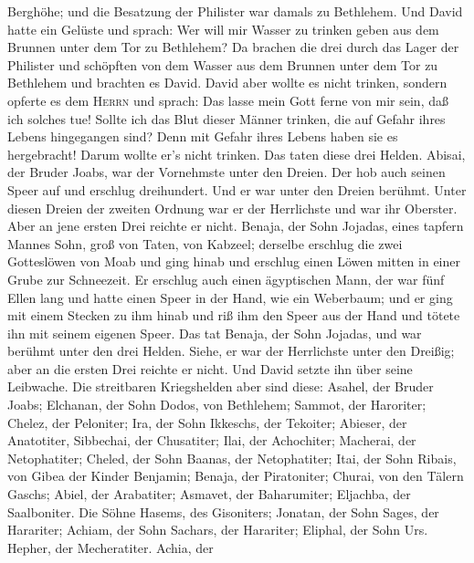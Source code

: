 Berghöhe; und die Besatzung der Philister war damals zu Bethlehem.
 Und David hatte ein Gelüste und sprach: Wer will mir
Wasser zu trinken geben aus dem Brunnen unter dem Tor zu Bethlehem?
 Da brachen die drei durch das Lager der Philister und
schöpften von dem Wasser aus dem Brunnen unter dem Tor zu Bethlehem und
brachten es David. David aber wollte es nicht trinken, sondern opferte
es dem \textsc{Herrn} und sprach:  Das lasse mein Gott
ferne von mir sein, daß ich solches tue! Sollte ich das Blut dieser
Männer trinken, die auf Gefahr ihres Lebens hingegangen sind? Denn mit
Gefahr ihres Lebens haben sie es hergebracht! Darum wollte er's nicht
trinken. Das taten diese drei Helden.  Abisai, der Bruder
Joabs, war der Vornehmste unter den Dreien. Der hob auch seinen Speer
auf und erschlug dreihundert. Und er war unter den Dreien berühmt.
 Unter diesen Dreien der zweiten Ordnung war er der
Herrlichste und war ihr Oberster. Aber an jene ersten Drei reichte er
nicht.  Benaja, der Sohn Jojadas, eines tapfern Mannes
Sohn, groß von Taten, von Kabzeel; derselbe erschlug die zwei
Gotteslöwen von Moab und ging hinab und erschlug einen Löwen mitten in
einer Grube zur Schneezeit.  Er erschlug auch einen
ägyptischen Mann, der war fünf Ellen lang und hatte einen Speer in der
Hand, wie ein Weberbaum; und er ging mit einem Stecken zu ihm hinab und
riß ihm den Speer aus der Hand und tötete ihn mit seinem eigenen Speer.
 Das tat Benaja, der Sohn Jojadas, und war berühmt unter
den drei Helden.  Siehe, er war der Herrlichste unter den
Dreißig; aber an die ersten Drei reichte er nicht. Und David setzte ihn
über seine Leibwache.  Die streitbaren Kriegshelden aber
sind diese: Asahel, der Bruder Joabs; Elchanan, der Sohn Dodos, von
Bethlehem;  Sammot, der Haroriter; Chelez, der Peloniter;
 Ira, der Sohn Ikkeschs, der Tekoiter; Abieser, der
Anatotiter,  Sibbechai, der Chusatiter; Ilai, der
Achochiter;  Macherai, der Netophatiter; Cheled, der Sohn
Baanas, der Netophatiter;  Itai, der Sohn Ribais, von
Gibea der Kinder Benjamin; Benaja, der Piratoniter; 
Churai, von den Tälern Gaschs; Abiel, der Arabatiter; 
Asmavet, der Baharumiter; Eljachba, der Saalboniter.  Die
Söhne Hasems, des Gisoniters; Jonatan, der Sohn Sages, der Harariter;
 Achiam, der Sohn Sachars, der Harariter; Eliphal, der
Sohn Urs.  Hepher, der Mecheratiter. Achia, der
